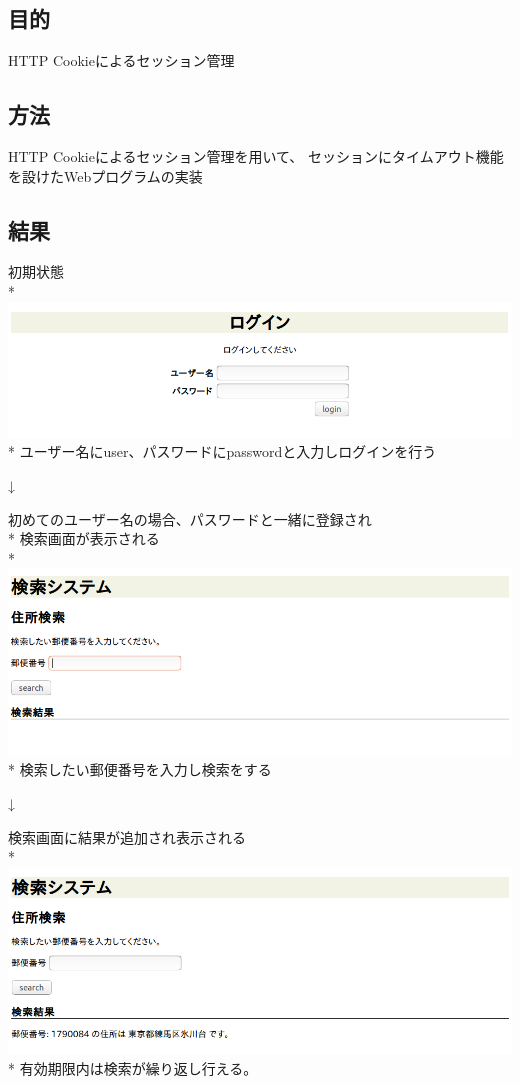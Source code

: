 \documentclass[a4j]{jarticle}
\begin{document}
\subsection{目的}
HTTP Cookieによるセッション管理

\subsection{方法}
HTTP Cookieによるセッション管理を用いて、
セッションにタイムアウト機能を設けたWebプログラムの実装

\subsection{結果}

\begin{center}
初期状態\\*
\includegraphics[width=\textwidth]{result/result1.png}\\*
ユーザー名にuser、パスワードにpasswordと入力しログインを行う

{\LARGE↓}

初めてのユーザー名の場合、パスワードと一緒に登録され\\*
検索画面が表示される\\*
\includegraphics[width=\textwidth]{result/result2.png}\\*
検索したい郵便番号を入力し検索をする

{\LARGE↓}

検索画面に結果が追加され表示される\\*
\includegraphics[width=\textwidth]{result/result3.png}\\*
有効期限内は検索が繰り返し行える。


\end{center}
\end{document}
